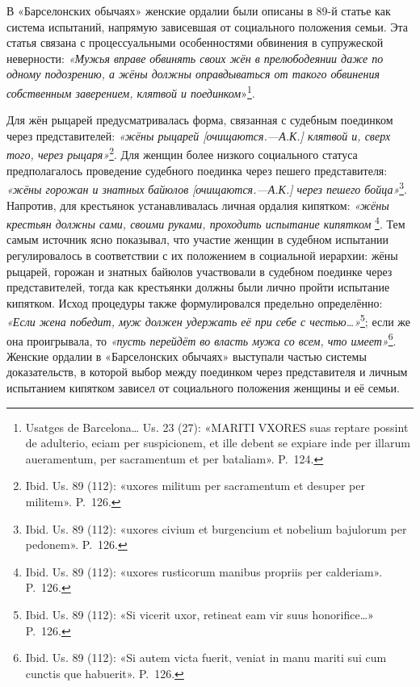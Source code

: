 В «Барселонских обычаях» женские ордалии были описаны в 89-й статье как система испытаний, напрямую зависевшая от социального положения семьи. Эта статья связана с процессуальными особенностями обвинения в супружеской неверности: \emph{«Мужья вправе обвинять своих жён в прелюбодеянии даже по одному подозрению, а жёны должны оправдываться от такого обвинения собственным заверением, клятвой и поединком}»\footnote{Usatges de Barcelona… Us. 23 (27): «MARITI VXORES suas reptare possint de adulterio, eciam per suspicionem, et ille debent se expiare inde per illarum aueramentum, per sacramentum et per bataliam». P.~124.}.

Для жён рыцарей предусматривалась форма, связанная с судебным поединком через представителей:  \emph{«жёны рыцарей [очищаются.---А.К.] клятвой и, сверх того, через рыцаря»}\footnote{Ibid. Us. 89 (112): «uxores militum per sacramentum et desuper per militem». P.~126.}. Для женщин более низкого социального статуса предполагалось проведение судебного поединка через пешего представителя: \emph{«жёны горожан и знатных }\emph{байюлов}\emph{ [очищаются.---А.К.] через пешего бойца»}\footnote{Ibid. Us. 89 (112): «uxores civium et burgencium et nobelium bajulorum per pedonem». P.~126.}. Напротив, для крестьянок устанавливалась личная ордалия кипятком: \emph{«жёны крестьян должны сами, своими руками, проходить испытание кипятком} \footnote{Ibid. Us. 89 (112): «uxores rusticorum manibus propriis per calderiam». P.~126.}. Тем самым источник ясно показывал, что участие женщин в судебном испытании регулировалось в соответствии с их положением в социальной иерархии: жёны рыцарей, горожан и знатных байюлов участвовали в судебном поединке через представителей, тогда как крестьянки должны были лично пройти испытание кипятком. Исход процедуры также формулировался предельно определённо: \emph{«Если жена победит, муж должен удержать её при себе с честью…»}\footnote{Ibid. Us. 89 (112): «Si vicerit uxor, retineat eam vir suus honorifice…» P.~126.}; если же она проигрывала, то \emph{«пусть перейдёт во власть мужа со всем, что имеет»}\footnote{Ibid. Us. 89 (112): «Si autem victa fuerit, veniat in manu mariti sui cum cunctis que habuerit». P.~126.}. Женские ордалии в «Барселонских обычаях» выступали частью системы доказательств, в которой выбор между поединком через представителя и личным испытанием кипятком зависел от социального положения женщины и её семьи.

